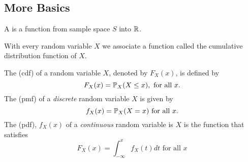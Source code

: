 \subsection{More Basics}
\begin{definition}
    A  is a function from sample space $S$ into $\mathbb R$.
\end{definition}
With every random variable $X$ we associate a function called the cumulative distribution function of $X$.
\begin{definition}
    The  (cdf) of a random variable $X$, denoted by $F_{X}(x)$, is defined by 
    $$
    F_X(x) = \mathbb P_X(X\leq x), \text{ for all } x.
    $$
    The  (pmf) of a \textit{discrete} random variable $X$ is given by
    $$
    f_X(x) = \mathbb P_X(X=x) \text{ for all } x.
    $$
    The  (pdf), $f_X(x)$ of a \textit{continuous} random variable is $X$ is the function that satisfies
    $$
    F_X(x) = \int_{-\infty}^{x}f_X(t)dt \text{ for all } x
    $$
    
    
\end{definition}
